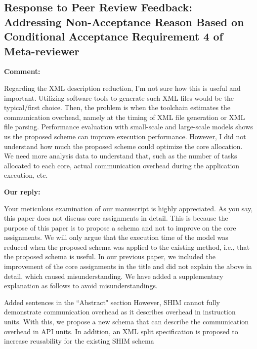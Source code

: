 \documentclass{article}
\begin{document}
\newpage
\subsection{Response to Peer Review Feedback: Addressing Non-Acceptance Reason Based on Conditional Acceptance Requirement 4 of Meta-reviewer}

\begin{flushleft}
  \textbf{Comment:}

\end{flushleft}
\begin{adjustwidth}{1cm}{1cm}  %
Regarding the XML description reduction, I'm not sure how this is useful and important.
  Utilizing software tools to generate such XML files would be the typical/first choice.
  Then, the problem is when the toolchain estimates the communication overhead, namely at the timing of XML file generation or XML file parsing.
  Performance evaluation with small-scale and large-scale models shows us the proposed scheme can improve execution performance.
  However, I did not understand how much the proposed scheme could optimize the core allocation.
  We need more analysis data to understand that, such as the number of tasks allocated to each core, actual communication overhead during the application execution, etc.
\end{adjustwidth}
    
    
\begin{flushleft}
  \textbf{Our reply:}
\end{flushleft}

\begin{adjustwidth}{1cm}{1cm}  %
Your meticulous examination of our manuscript is highly appreciated. As you say, this paper does not discuss core assignments in detail. This is because the purpose of this paper is to propose a schema and not to improve on the core assignments. We will only argue that the execution time of the model was reduced when the proposed schema was applied to the existing method, i.e., that the proposed schema is useful.
In our previous paper, we included the improvement of the core assignments in the title and did not explain the above in detail, which caused misunderstanding. We have added a supplementary explanation as follows to avoid misunderstandings.
\end{adjustwidth}
\bigskip
\begin{itembox}[|]{Added sentences in the ``Abstract" section}
However, SHIM cannot fully demonstrate communication overhead as it describes overhead in instruction units. With this, we propose a new schema that can describe the communication overhead in API units. In addition, an XML split specification is proposed to increase reusability for the existing SHIM schema
\end{itembox}\\
\end{document}
